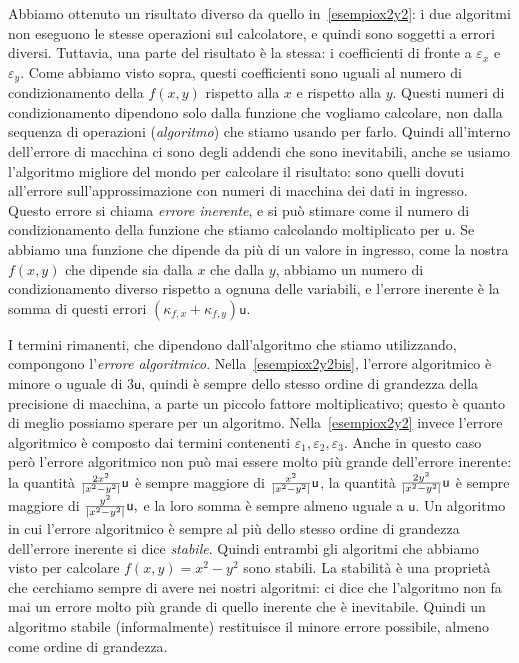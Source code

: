 \documentclass[a4paper]{report}
\DeclarePairedDelimiter{\abs}{\lvert}{\rvert}
\theoremstyle{definiton}
\theoremstyle{remark}
\begin{document}
Abbiamo ottenuto un risultato diverso da quello in~\eqref{esempiox2y2}: i due algoritmi non eseguono le stesse operazioni sul calcolatore, e quindi sono soggetti a errori diversi. Tuttavia, una parte del risultato è la stessa: i coefficienti di fronte a $\varepsilon_x$ e $\varepsilon_y$. Come abbiamo visto sopra, questi coefficienti sono uguali al numero di condizionamento della $f(x,y)$ rispetto alla $x$ e rispetto alla $y$. Questi numeri di condizionamento dipendono solo dalla funzione che vogliamo calcolare, non dalla sequenza di operazioni (\emph{algoritmo}) che stiamo usando per farlo. Quindi all'interno dell'errore di macchina ci sono degli addendi che sono inevitabili, anche se usiamo l'algoritmo migliore del mondo per calcolare il risultato: sono quelli dovuti all'errore sull'approssimazione con numeri di macchina dei dati in ingresso. Questo errore si chiama \emph{errore inerente}, e si può stimare come il numero di condizionamento della funzione che stiamo calcolando moltiplicato per $\mathsf{u}$. Se abbiamo una funzione che dipende da più di un valore in ingresso, come la nostra $f(x,y)$ che dipende sia dalla $x$ che dalla $y$, abbiamo un numero di condizionamento diverso rispetto a ognuna delle variabili, e l'errore inerente è la somma di questi errori $\left(\kappa_{f,x}+\kappa_{f,y}\right)\mathsf{u}$.

I termini rimanenti, che dipendono dall'algoritmo che stiamo utilizzando, compongono l'\emph{errore algoritmico}. Nella~\eqref{esempiox2y2bis}, l'errore algoritmico è minore o uguale di $3\mathsf{u}$, quindi è sempre dello stesso ordine di grandezza della precisione di macchina, a parte un piccolo fattore moltiplicativo; questo è quanto di meglio possiamo sperare per un algoritmo. Nella~\eqref{esempiox2y2} invece l'errore algoritmico è composto dai termini contenenti $\varepsilon_1,\varepsilon_2,\varepsilon_3$. Anche in questo caso però l'errore algoritmico non può mai essere molto più grande dell'errore inerente: la quantità
$
\frac{2x^2}{\abs{x^2-y^2}}\mathsf{u}
$
è sempre maggiore di 
$
\frac{x^2}{\abs{x^2-y^2}}\mathsf{u}
$, la quantità 
$
\frac{2y^2}{\abs{x^2-y^2}}\mathsf{u}
$
è sempre maggiore di 
$
\frac{y^2}{\abs{x^2-y^2}}\mathsf{u},
$
e la loro somma è sempre almeno uguale a $\mathsf{u}$. Un algoritmo in cui l'errore algoritmico è sempre al più dello stesso ordine di grandezza dell'errore inerente si dice \emph{stabile}. Quindi entrambi gli algoritmi che abbiamo visto per calcolare $f(x,y) = x^2-y^2$ sono stabili. La stabilità  è una proprietà che cerchiamo sempre di avere nei nostri algoritmi: ci dice che l'algoritmo non fa mai un errore molto più grande di quello inerente che è inevitabile. Quindi un algoritmo stabile (informalmente) restituisce il minore errore possibile, almeno come ordine di grandezza.
\end{document}
